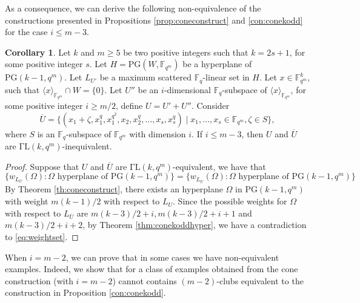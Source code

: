 \documentclass[11pt]{amsart}
\theoremstyle{definition}
\newtheorem{corollary}[theorem]{Corollary}
\newcommand{\fq}{{\mathbb F}_{q}}
\newcommand{\PG}{\mathrm{PG}}
\newcommand{\fqm}{\mathbb{F}_{q^m}}
\begin{document}
As a consequence, we can derive the following non-equivalence of the constructions presented in Propositions \ref{prop:coneconstruct} and \ref{con:conekodd} for the case $i\leq m-3$.

\begin{corollary}
    Let $k$ and $m\geq 5$ be two positive integers such that $k=2s+1$, for some positive integer $s$.
    Let $H=\PG(W,\fqm)$ be a hyperplane of $\mathrm{PG}(k-1,q^m)$. Let $L_{U'}$ be a maximum scattered $\fq$-linear set in $H$.
    Let $x\in \mathbb{F}_{q^m}^k$, such that $\langle x\rangle_{\mathbb{F}_{q^m}}\cap  W= \{0\}$. Let $U''$ be an $i$-dimensional $\fq$-subspace of $\langle x\rangle_{\mathbb{F}_{q^m}}$, for some positive integer $i\geq m/2$, define 
    $U=U'+U''$.
    Consider
    $$\overline{U}=\{(x_1+\zeta,x_1^q,x_1^{q^2}, x_2, x_2^{q}, \ldots, x_s,x_s^{q} )\mid x_1,\ldots,x_s\in \mathbb{F}_{q^m}, \zeta\in S\},$$
    where $S$ is an $\fq$-subspace of $\fqm$ with dimension $i$.
    If $i\leq m-3$, then $U$ and $\overline{U}$ are $\mathrm{\Gamma L}(k,q^m)$-inequivalent.
\end{corollary}
\begin{proof}
    Suppose that $U$ and $\overline{U}$ are $\mathrm{\Gamma L}(k,q^m)$-equivalent, we have that 
    \begin{equation}\label{eq:weightset} \{w_{L_{U}}(\Omega) \colon \Omega \text{ hyperplane of } \mathrm{PG}(k-1,q^m)\}=\{w_{L_{\overline{U}}}(\Omega) \colon \Omega \text{ hyperplane of } \mathrm{PG}(k-1,q^m)\} \end{equation}
    By Theorem \ref{th:coneconstruct}, there exists an hyperplane $\Omega$ in $\mathrm{PG}(k-1,q^m)$ with weight $m(k-1)/2$ with respect to $L_U$. Since the possible weights for $\Omega$ with respect to $L_{\overline{U}}$ are $m(k-3)/2+i, m(k-3)/2+i+1$ and $m(k-3)/2+i+2$, by Theorem \ref{thm:conekoddhyper}, we have a contradiction to \eqref{eq:weightset}. 
\end{proof}

When $i=m-2$, we can prove that in some cases we have non-equivalent examples. Indeed, we show that for a class of examples obtained from the cone construction (with $i=m-2$) cannot contains $(m-2)$-clubs equivalent to the construction in Proposition \ref{con:conekodd}.
\end{document}
